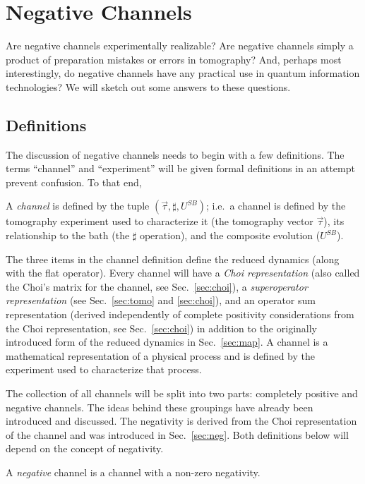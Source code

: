 \chapter{Negative Channels}

Are negative channels experimentally realizable?  Are negative channels simply a product of preparation mistakes or errors in tomography?  And, perhaps most interestingly, do negative channels have any practical use in quantum information technologies?  We will sketch out some answers to these questions.   

\section{Definitions}

The discussion of negative channels needs to begin with a few definitions.  The terms ``channel'' and ``experiment'' will be given formal definitions in an attempt prevent confusion.  To that end,
\begin{definition}
A {\em channel} is defined by the tuple $(\vec{\tau},\sharp,U^{SB})$; i.e.\ a channel is defined by the tomography experiment used to characterize it (the tomography vector $\vec{\tau}$), its relationship to the bath (the $\sharp$ operation), and the composite evolution ($U^{SB}$).  
\end{definition}

The three items in the channel definition define the reduced dynamics (along with the flat operator).  Every channel will have a {\em Choi representation} (also called the Choi's matrix for the channel, see Sec.\ \ref{sec:choi}), a {\em superoperator representation} (see Sec.\ \ref{sec:tomo} and \ref{sec:choi}), and an operator sum representation (derived independently of complete positivity considerations from the Choi representation, see Sec.\ \ref{sec:choi}) in addition to the originally introduced form of the reduced dynamics in Sec.\ \ref{sec:map}.  A channel is a mathematical representation of a physical process and is defined by the experiment used to characterize that process.

The collection of all channels will be split into two parts: completely positive and negative channels.  The ideas behind these groupings have already been introduced and discussed.  The negativity is derived from the Choi representation of the channel and was introduced in Sec.\ \ref{sec:neg}.  Both definitions below will depend on the concept of negativity.

\begin{definition}
A {\em negative} channel is a channel with a non-zero negativity.  
\end{definition}  

